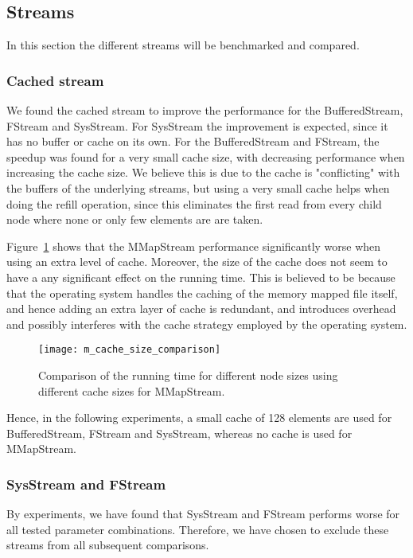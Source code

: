 \subsection{Streams}
In this section the different streams will be benchmarked and compared.

\subsubsection{Cached stream}
We found the cached stream to improve the performance for the BufferedStream, FStream and SysStream. For SysStream the improvement is expected, since it has no buffer or cache on its own. For the BufferedStream and FStream, the speedup was found for a very small cache size, with decreasing performance when increasing the cache size. We believe this is due to the cache is "conflicting" with the buffers of the underlying streams, but using a very small cache helps when doing the refill operation, since this eliminates the first read from every child node where none or only few elements are are taken.

Figure~\ref{fig:m-cache-size-comparison} shows that the MMapStream performance significantly worse when using an extra level of cache. Moreover, the size of the cache does not seem to have a any significant effect on the running time. This is believed to be because that the operating system handles the caching of the memory mapped file itself, and hence adding an extra layer of cache is redundant, and introduces overhead and possibly interferes with the cache strategy employed by the operating system.

\begin{figure}
  \centering
  \texttt{[image: m\_cache\_size\_comparison]}
  \caption{Comparison of the running time for different node sizes using different cache sizes for MMapStream.}
  \label{fig:m-cache-size-comparison}
\end{figure}

Hence, in the following experiments, a small cache of 128 elements are used for BufferedStream, FStream and SysStream, whereas no cache is used for MMapStream.

\subsubsection{SysStream and FStream}
By experiments, we have found that SysStream and FStream performs worse for all tested parameter combinations. Therefore, we have chosen to exclude these streams from all subsequent comparisons.

